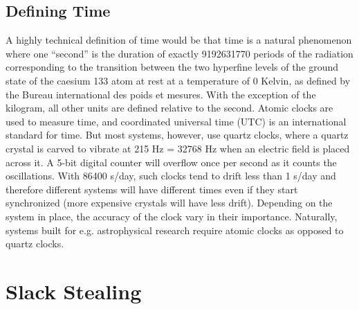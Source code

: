 \documentclass[conference]{IEEEtran}
\begin{document}
\subsection{Defining Time}
A highly technical definition of time would be that time is a natural phenomenon where one “second” is the duration of exactly 9192631770 periods of the radiation corresponding to the transition between the two
hyperfine levels of the ground state of the caesium 133 atom at rest at a temperature of 0 Kelvin,
as defined by the Bureau international des poids et mesures. With the exception of the kilogram, all other units are
defined relative to the second. Atomic clocks are used to measure time, and coordinated universal time (UTC) is an
international standard for time. But most systems, however, use quartz clocks, where a quartz crystal is carved to
vibrate at 215 Hz = 32768 Hz when an electric field is placed across it. A 5-bit digital counter will overflow once per
second as it counts the oscillations. With 86400 s/day, such clocks tend to drift less than 1 s/day and therefore different
systems will have different times even if they start synchronized (more expensive crystals will have less drift). Depending on the system in place, the accuracy of the clock vary in their importance. Naturally, systems built for e.g. astrophysical research require atomic clocks as opposed to quartz clocks.

\section {Slack Stealing}
\end{document}
